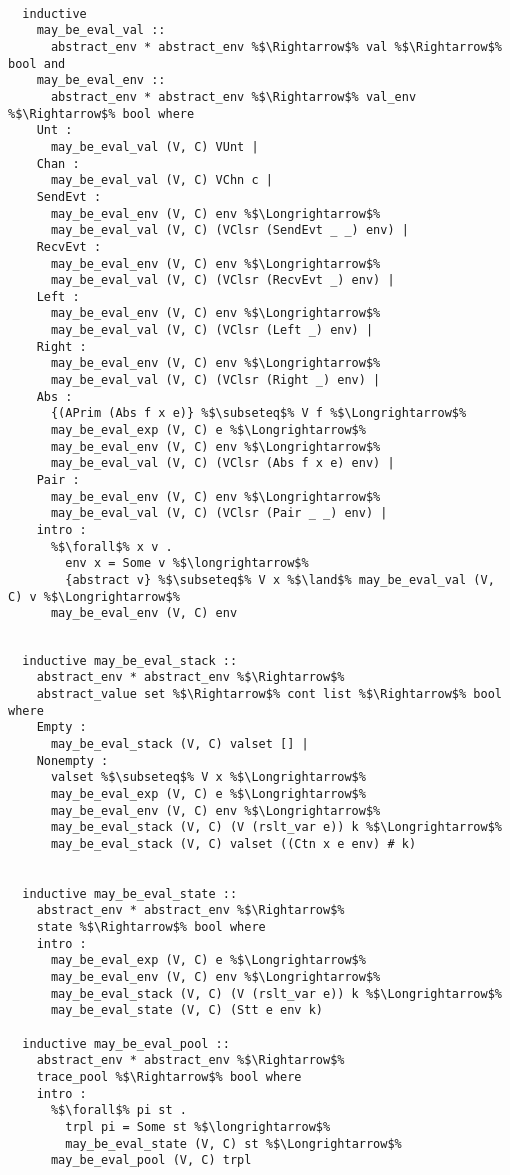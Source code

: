 \documentclass{article}
\begin{document}
\begin{lstlisting}[style=codestyle1, escapechar=\%]

  inductive 
    may_be_eval_val ::
      abstract_env * abstract_env %$\Rightarrow$% val %$\Rightarrow$% bool and  
    may_be_eval_env ::
      abstract_env * abstract_env %$\Rightarrow$% val_env %$\Rightarrow$% bool where
    Unt :
      may_be_eval_val (V, C) VUnt |
    Chan :
      may_be_eval_val (V, C) VChn c |
    SendEvt :
      may_be_eval_env (V, C) env %$\Longrightarrow$%
      may_be_eval_val (V, C) (VClsr (SendEvt _ _) env) |
    RecvEvt :
      may_be_eval_env (V, C) env %$\Longrightarrow$%
      may_be_eval_val (V, C) (VClsr (RecvEvt _) env) |
    Left :
      may_be_eval_env (V, C) env %$\Longrightarrow$%
      may_be_eval_val (V, C) (VClsr (Left _) env) |
    Right :
      may_be_eval_env (V, C) env %$\Longrightarrow$%
      may_be_eval_val (V, C) (VClsr (Right _) env) |
    Abs :
      {(APrim (Abs f x e)} %$\subseteq$% V f %$\Longrightarrow$% 
      may_be_eval_exp (V, C) e %$\Longrightarrow$% 
      may_be_eval_env (V, C) env %$\Longrightarrow$%
      may_be_eval_val (V, C) (VClsr (Abs f x e) env) |
    Pair :
      may_be_eval_env (V, C) env %$\Longrightarrow$%
      may_be_eval_val (V, C) (VClsr (Pair _ _) env) |
    intro :  
      %$\forall$% x v .
        env x = Some v %$\longrightarrow$%
        {abstract v} %$\subseteq$% V x %$\land$% may_be_eval_val (V, C) v %$\Longrightarrow$%
      may_be_eval_env (V, C) env

  \end{lstlisting}
\begin{lstlisting}[style=codestyle1, escapechar=\%]

  inductive may_be_eval_stack ::
    abstract_env * abstract_env %$\Rightarrow$%
    abstract_value set %$\Rightarrow$% cont list %$\Rightarrow$% bool where
    Empty :
      may_be_eval_stack (V, C) valset [] |
    Nonempty : 
      valset %$\subseteq$% V x %$\Longrightarrow$%
      may_be_eval_exp (V, C) e %$\Longrightarrow$%
      may_be_eval_env (V, C) env %$\Longrightarrow$%
      may_be_eval_stack (V, C) (V (rslt_var e)) k %$\Longrightarrow$%
      may_be_eval_stack (V, C) valset ((Ctn x e env) # k)


  inductive may_be_eval_state ::
    abstract_env * abstract_env %$\Rightarrow$%
    state %$\Rightarrow$% bool where
    intro :
      may_be_eval_exp (V, C) e %$\Longrightarrow$%
      may_be_eval_env (V, C) env %$\Longrightarrow$%
      may_be_eval_stack (V, C) (V (rslt_var e)) k %$\Longrightarrow$%
      may_be_eval_state (V, C) (Stt e env k)

  inductive may_be_eval_pool ::
    abstract_env * abstract_env %$\Rightarrow$%
    trace_pool %$\Rightarrow$% bool where
    intro :
      %$\forall$% pi st .
        trpl pi = Some st %$\longrightarrow$%
        may_be_eval_state (V, C) st %$\Longrightarrow$% 
      may_be_eval_pool (V, C) trpl

  \end{lstlisting}
\end{document}

